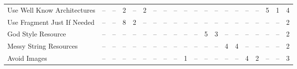 \begin{table*}[t]
\begin{tabular}{@{}p{4cm}|p{.2cm}p{.2cm}p{.2cm}p{.2cm}p{.2cm}p{.2cm}p{.2cm}p{.2cm}p{.2cm}p{.4cm}p{.4cm}p{.4cm}p{.4cm}p{.4cm}p{.4cm}p{.4cm}p{.4cm}p{.4cm}|p{1.5cm}@{}}
Use Well Know Architectures					& \multicolumn{1}{c}{--}		& \multicolumn{1}{c}{--}		& \multicolumn{1}{c}{2}	& \multicolumn{1}{c}{--}	& \multicolumn{1}{c}{2}	& \multicolumn{1}{c}{--}	& \multicolumn{1}{c}{--}	& \multicolumn{1}{c}{--}	& \multicolumn{1}{c}{--}	& \multicolumn{1}{c}{--}	& \multicolumn{1}{c}{--}	& \multicolumn{1}{c}{--}	& \multicolumn{1}{c}{--}	& \multicolumn{1}{c}{--}	& \multicolumn{1}{c}{--}	& \multicolumn{1}{c}{--}	& \multicolumn{1}{c}{5}	& \multicolumn{1}{c}{1} 		& \multicolumn{1}{|c}{4} \\
Use Fragment Just If Needed					& \multicolumn{1}{c}{--}		& \multicolumn{1}{c}{--}		& \multicolumn{1}{c}{8}	& \multicolumn{1}{c}{2}	& \multicolumn{1}{c}{--}	& \multicolumn{1}{c}{--}	& \multicolumn{1}{c}{--}	& \multicolumn{1}{c}{--}	& \multicolumn{1}{c}{--}	& \multicolumn{1}{c}{--}	& \multicolumn{1}{c}{--}	& \multicolumn{1}{c}{--}	& \multicolumn{1}{c}{--}	& \multicolumn{1}{c}{--}	& \multicolumn{1}{c}{--}	& \multicolumn{1}{c}{--}	& \multicolumn{1}{c}{--}	& \multicolumn{1}{c}{--} 		& \multicolumn{1}{|c}{2} \\
God Style Resource							& \multicolumn{1}{c}{--}		& \multicolumn{1}{c}{--}		& \multicolumn{1}{c}{--}	& \multicolumn{1}{c}{--}	& \multicolumn{1}{c}{--}	& \multicolumn{1}{c}{--}	& \multicolumn{1}{c}{--}	& \multicolumn{1}{c}{--}	& \multicolumn{1}{c}{--}	& \multicolumn{1}{c}{--}	& \multicolumn{1}{c}{5}	& \multicolumn{1}{c}{3}	& \multicolumn{1}{c}{--}	& \multicolumn{1}{c}{--}	& \multicolumn{1}{c}{--}	& \multicolumn{1}{c}{--}	& \multicolumn{1}{c}{--}	& \multicolumn{1}{c}{--} 		& \multicolumn{1}{|c}{2} \\
Messy String Resources						& \multicolumn{1}{c}{--}		& \multicolumn{1}{c}{--}		& \multicolumn{1}{c}{--}	& \multicolumn{1}{c}{--}	& \multicolumn{1}{c}{--}	& \multicolumn{1}{c}{--}	& \multicolumn{1}{c}{--}	& \multicolumn{1}{c}{--}	& \multicolumn{1}{c}{--}	& \multicolumn{1}{c}{--}	& \multicolumn{1}{c}{--}	& \multicolumn{1}{c}{--}	& \multicolumn{1}{c}{4}	& \multicolumn{1}{c}{4}	& \multicolumn{1}{c}{--}	& \multicolumn{1}{c}{--}	& \multicolumn{1}{c}{--}	& \multicolumn{1}{c}{--} 		& \multicolumn{1}{|c}{2} \\
Avoid Images								& \multicolumn{1}{c}{--}		& \multicolumn{1}{c}{--}		& \multicolumn{1}{c}{--}	& \multicolumn{1}{c}{--}	& \multicolumn{1}{c}{--}	& \multicolumn{1}{c}{--}	& \multicolumn{1}{c}{--}	& \multicolumn{1}{c}{--}	& \multicolumn{1}{c}{1}	& \multicolumn{1}{c}{--}	& \multicolumn{1}{c}{--}	& \multicolumn{1}{c}{--}	& \multicolumn{1}{c}{--}	& \multicolumn{1}{c}{--}	& \multicolumn{1}{c}{4}	& \multicolumn{1}{c}{2}	& \multicolumn{1}{c}{--}	& \multicolumn{1}{c}{--} 		& \multicolumn{1}{|c}{3} \\

\end{tabular}
\end{table*}
